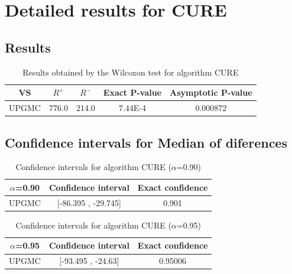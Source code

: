 \documentclass[a4paper,10pt]{article}
\begin{document}
 \clearpage 


\section{Detailed results for CURE}


\subsection{Results}

\begin{table}[!htp]
\centering\small
\begin{tabular}{
|c|c|c|c|c|}
\hline
 VS & $R^{+}$ & $R^{-}$ & Exact P-value & Asymptotic P-value \\ \hline 
UPGMC & 776.0 & 214.0 & 7.44E-4 & 0.000872\\ \hline 

\end{tabular}
\caption{Results obtained by the Wilcoxon test for algorithm CURE}
\end{table}

\subsection{Confidence intervals for Median of diferences}

\begin{table}[!htp]
\centering\small
\begin{tabular}{
|c|c|c|}
\hline
 $\alpha$=0.90 & Confidence interval & Exact confidence \\ \hline 
UPGMC & [-86.395 , -29.745] & 0.901\\ \hline 

\end{tabular}
\caption{Confidence intervals for algorithm CURE ($\alpha$=0.90)}
\end{table}
\begin{table}[!htp]
\centering\small
\begin{tabular}{
|c|c|c|}
\hline
 $\alpha$=0.95 & Confidence interval & Exact confidence \\ \hline 
UPGMC & [-93.495 , -24.63] & 0.95006\\ \hline 

\end{tabular}
\caption{Confidence intervals for algorithm CURE ($\alpha$=0.95)}
\end{table}

 \clearpage 
\end{document}

